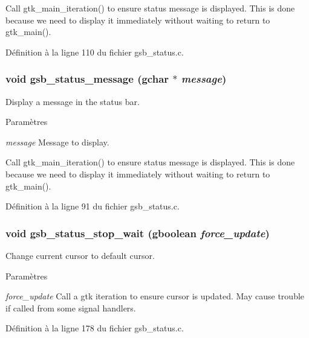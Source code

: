 Call gtk\_\-main\_\-iteration() to ensure status message is displayed. This is done because we need to display it immediately without waiting to return to gtk\_\-main(). 



Définition à la ligne 110 du fichier gsb\_\-status.c.

\subsubsection[{gsb\_\-status\_\-message}]{\setlength{\rightskip}{0pt plus 5cm}void gsb\_\-status\_\-message (gchar $\ast$ {\em message})}\label{gsb__status_8h_a476044d7002fa33e44709e7293974914}
Display a message in the status bar.


\begin{DoxyParams}{Paramètres}
\item[{\em message}]Message to display. \end{DoxyParams}


Call gtk\_\-main\_\-iteration() to ensure status message is displayed. This is done because we need to display it immediately without waiting to return to gtk\_\-main(). 



Définition à la ligne 91 du fichier gsb\_\-status.c.

\subsubsection[{gsb\_\-status\_\-stop\_\-wait}]{\setlength{\rightskip}{0pt plus 5cm}void gsb\_\-status\_\-stop\_\-wait (gboolean {\em force\_\-update})}\label{gsb__status_8h_ac4035c7e810531f0bf1264ae3be76c52}
Change current cursor to default cursor.


\begin{DoxyParams}{Paramètres}
\item[{\em force\_\-update}]Call a gtk iteration to ensure cursor is updated. May cause trouble if called from some signal handlers. \end{DoxyParams}


Définition à la ligne 178 du fichier gsb\_\-status.c.

